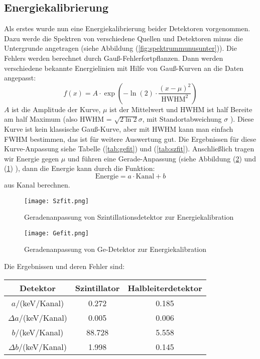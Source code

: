 \documentclass[ngerman,11pt]{article}
\begin{document}
\begin{multicols}{2}
		\subsection{Energiekalibrierung}
		Als erstes wurde nun eine Energiekalibrierung beider Detektoren vorgenommen. Dazu werde die Spektren von verschiedene Quellen und Detektoren minus die Untergrunde angetragen (siehe Abbildung (\ref{fig:spektrummunusunter})). Die Fehlers werden berechnet durch Gau\ss-Fehlerfortpflanzen. Dann werden verschiedene bekannte Energielinien mit Hilfe von Gau\ss-Kurven an die Daten angepasst:
		$$
		f(x) = A\cdot\exp\left( -\ln(2)\cdot\frac{(x-\mu)^2}{\mathrm{HWHM}^2} \right)
		$$
		$A$ ist die Amplitude der Kurve, $\mu$ ist der Mittelwert und HWHM ist half Bereite am half Maximum (also HWHM = $\sqrt{2\ln2}\sigma$, mit Standortabweichung $\sigma$ ). Diese Kurve ist kein klassische Gau\ss-Kurve, aber mit HWHM kann man einfach FWHM bestimmen, das ist f\"ur weitere Auswertung gut. Die Ergebnissen f\"ur diese Kurve-Anpassung siehe Tabelle (\ref{tab:gefit}) und (\ref{tab:szfit}). Anschlie\ss lich tragen wir Energie gegen $\mu$ und f\"uhren eine Gerade-Anpassung (siehe Abbildung (\ref{fig:gefit}) und (\ref{fig:szfit}) ), dann die Energie kann durch die Funktion:
		\begin{equation}\label{eq: energiekanal}
			\mathrm{Energie} = a\cdot\mathrm{Kanal}+b
		\end{equation}
		aus Kanal berechnen.
		
		\begin{figure}[H]
			\centering
			\texttt{[image: Szfit.png]}
			\caption{Geradenanpassung von Szintillationsdetektor zur Energiekalibration}
			\label{fig:szfit}
		\end{figure}
	\begin{figure}[H]
		\centering
		\texttt{[image: Gefit.png]}
		\caption{Geradenanpassung von Ge-Detektor zur Energiekalibration}
		\label{fig:gefit}
	\end{figure}
	Die Ergebnissen und deren Fehler sind:
	\begin{center}
		\begin{tabular}{|c|c|c|}
			\hline
			Detektor& Szintillator & Halbleiterdetektor\\ \hline
			$a$/(keV/Kanal) & 0.272&0.185\\ \hline
			$\Delta a$/(keV/Kanal) & 0.005&0.006\\ \hline
			$b$/(keV/Kanal) &  88.728 &5.558\\ \hline
			$\Delta b$/(keV/Kanal)&1.998&0.145\\ \hline
		\end{tabular}
	\end{center}

\end{multicols}
\end{document}
